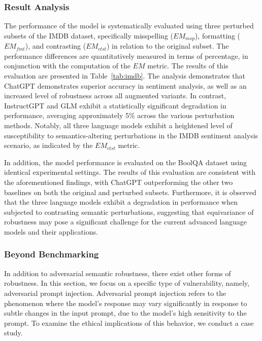 \subsubsection{\textbf{Result Analysis}}


\hfill

The performance of the model is systematically evaluated using three perturbed subsets of the IMDB dataset, specifically misspelling ($EM_{msp}$), formatting ($EM_{fmt}$), and contrasting ($EM_{ctst}$) in relation to the original subset. The performance differences are quantitatively measured in terms of percentage, in conjunction with the computation of the $EM$ metric. The results of this evaluation are presented in Table~\ref{tab:imdb}. The analysis demonstrates that ChatGPT demonstrates superior accuracy in sentiment analysis, as well as an increased level of robustness across all augmented variants. In contrast, InstructGPT and GLM exhibit a statistically significant degradation in performance, averaging approximately 5\% across the various perturbation methods. Notably, all three language models exhibit a heightened level of susceptibility to semantics-altering perturbations in the IMDB sentiment analysis scenario, as indicated by the $EM_{ctst}$ metric.

In addition, the model performance is evaluated on the BoolQA dataset using identical experimental settings. The results of this evaluation are consistent with the aforementioned findings, with ChatGPT outperforming the other two baselines on both the original and perturbed subsets. Furthermore, it is observed that the three language models exhibit a degradation in performance when subjected to contrasting semantic perturbations, suggesting that equivariance of robustness may pose a significant challenge for the current advanced language models and their applications.

\subsubsection{\textbf{Beyond Benchmarking}}
\hfill

In addition to adversarial semantic robustness, there exist other forms of robustness. In this section, we focus on a specific type of vulnerability, namely, adversarial prompt injection. Adversarial prompt injection refers to the phenomenon where the model's response may vary significantly in response to subtle changes in the input prompt, due to the model's high sensitivity to the prompt. To examine the ethical implications of this behavior, we conduct a case study.

